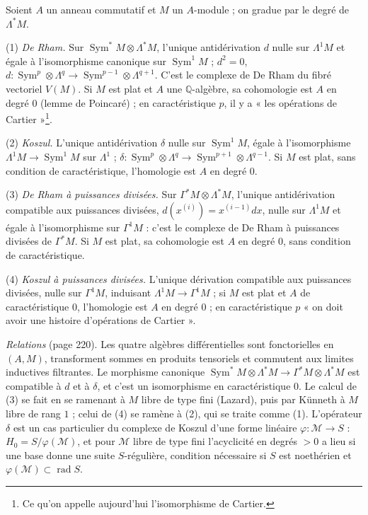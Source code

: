 \documentclass[11pt,a4paper]{article}
\begin{document}
Soient $A$ un anneau commutatif et $M$ un $A$-module ; on gradue par le degré
de $\Lambda^*M$.

(1) \emph{De Rham.} Sur $\operatorname{Sym}^*M \otimes \Lambda^*M$, l'unique
antidérivation $d$ nulle sur $\Lambda^1M$ et égale à l'isomorphisme canonique
sur $\operatorname{Sym}^1M$ ; $d^2 = 0$, $d : \operatorname{Sym}^p \otimes
\Lambda^q \to \operatorname{Sym}^{p-1} \otimes \Lambda^{q+1}$. C'est le complexe
de De Rham du fibré vectoriel $V(M)$. Si $M$ est plat et $A$ une
$\mathbb{Q}$-algèbre, sa cohomologie est $A$ en degré $0$ (lemme de Poincaré) ;
en caractéristique $p$, il y a « les opérations de Cartier »\footnote{Ce qu'on
appelle aujourd'hui l'isomorphisme de Cartier.}.

(2) \emph{Koszul.} L'unique antidérivation $\delta$ nulle sur
$\operatorname{Sym}^1M$, égale à l'isomorphisme $\Lambda^1M \to
\operatorname{Sym}^1M$ sur $\Lambda^1$ ; $\delta : \operatorname{Sym}^p \otimes
\Lambda^q \to \operatorname{Sym}^{p+1} \otimes \Lambda^{q-1}$. Si $M$ est plat,
sans condition de caractéristique, l'homologie est $A$ en degré $0$.

(3) \emph{De Rham à puissances divisées.} Sur $\Gamma^*M \otimes \Lambda^*M$,
l'unique antidérivation compatible aux puissances divisées, $d(x^{(i)}) =
x^{(i-1)}dx$, nulle sur $\Lambda^1M$ et égale à l'isomorphisme sur $\Gamma^1M$ :
c'est le complexe de De Rham à puissances divisées de $\Gamma^*M$. Si $M$ est
plat, sa cohomologie est $A$ en degré $0$, sans condition de caractéristique.

(4) \emph{Koszul à puissances divisées.} L'unique dérivation compatible aux
puissances divisées, nulle sur $\Gamma^1M$, induisant $\Lambda^1M \to \Gamma^1M$ ;
si $M$ est plat et $A$ de caractéristique $0$, l'homologie est $A$ en degré
$0$ ; en caractéristique $p$ « on doit avoir une histoire d'opérations de
Cartier ».

\emph{Relations} (page 220). Les quatre algèbres différentielles sont
fonctorielles en $(A, M)$, transforment sommes en produits tensoriels et
commutent aux limites inductives filtrantes. Le morphisme canonique
$\operatorname{Sym}^*M \otimes \Lambda^*M \to \Gamma^*M \otimes \Lambda^*M$ est
compatible à $d$ et à $\delta$, et c'est un isomorphisme en caractéristique
$0$. Le calcul de (3) se fait en se ramenant à $M$ libre de type fini (Lazard),
puis par Künneth à $M$ libre de rang $1$ ; celui de (4) se ramène à (2), qui se
traite comme (1). L'opérateur $\delta$ est un cas particulier du complexe de
Koszul d'une forme linéaire $\varphi : \mathcal{M} \to S$ : $H_0 =
S/\varphi(\mathcal{M})$, et pour $\mathcal{M}$ libre de type fini l'acyclicité en
degrés $> 0$ a lieu si une base donne une suite $S$-régulière, condition
nécessaire si $S$ est noethérien et $\varphi(\mathcal{M}) \subset
\operatorname{rad}S$.
\end{document}
